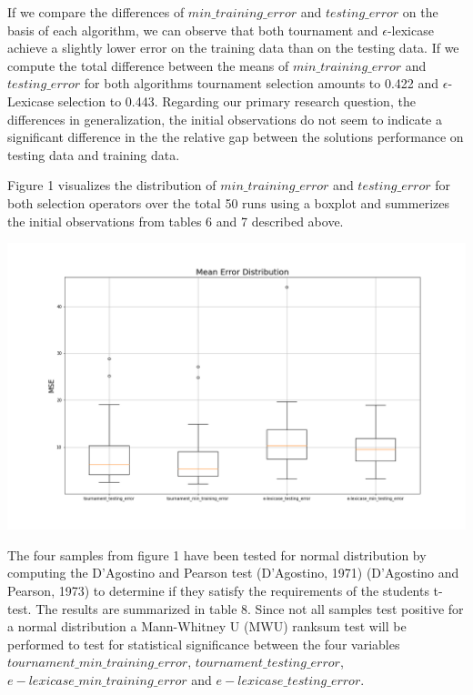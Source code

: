 \documentclass[
  12pt,
]{article}
\let\origfigure\figure
\let\endorigfigure\endfigure
\renewenvironment{figure}[1][2] {
    \expandafter\origfigure\expandafter[H]
} {
    \endorigfigure
}
\begin{document}
If we compare the differences of \(min\_training\_error\) and
\(testing\_error\) on the basis of each algorithm, we can observe that
both tournament and \(\epsilon\)-lexicase achieve a slightly lower error
on the training data than on the testing data. If we compute the total
difference between the means of \(min\_training\_error\) and
\(testing\_error\) for both algorithms tournament selection amounts to
0.422 and \(\epsilon\)-Lexicase selection to 0.443. Regarding our
primary research question, the differences in generalization, the
initial observations do not seem to indicate a significant difference in
the the relative gap between the solutions performance on testing data
and training data.

Figure 1 visualizes the distribution of \(min\_training\_error\) and
\(testing\_error\) for both selection operators over the total 50 runs
using a boxplot and summerizes the initial observations from tables 6
and 7 described above.

\begin{figure}
\centering
\includegraphics{./plots/mean_error_boxplot_all.png}
\caption{Distribution of Errors}
\end{figure}

The four samples from figure 1 have been tested for normal distribution
by computing the D'Agostino and Pearson test (D'Agostino, 1971)
(D'Agostino and Pearson, 1973) to determine if they satisfy the
requirements of the students t-test. The results are summarized in table
8. Since not all samples test positive for a normal distribution a
Mann-Whitney U (MWU) ranksum test will be performed to test for
statistical significance between the four variables
\(tournament\_min\_training\_error\), \(tournament\_testing\_error\),
\(e-lexicase\_min\_training\_error\) and \(e-lexicase\_testing\_error\).
\end{document}
